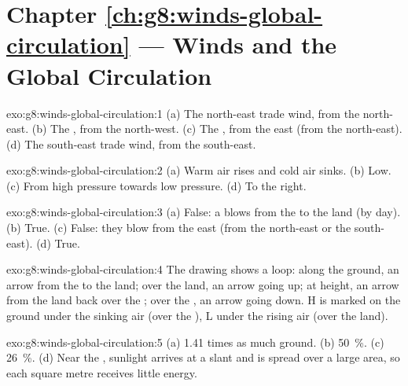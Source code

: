 \section*{Chapter \ref{ch:g8:winds-global-circulation} --- Winds and the Global Circulation}

\begin{solution}{exo:g8:winds-global-circulation:1}
(a) The north-east trade wind, from the north-east. (b) The ,
from the north-west. (c) The , from the east (from the
north-east). (d) The south-east trade wind, from the south-east.
\end{solution}

\begin{solution}{exo:g8:winds-global-circulation:2}
(a) Warm air rises and cold air sinks. (b) Low. (c) From high pressure
towards low pressure. (d) To the right.
\end{solution}

\begin{solution}{exo:g8:winds-global-circulation:3}
(a) False: a  blows from the  to the land (by day).
(b) True. (c) False: they blow from the east (from the north-east or the
south-east). (d) True.
\end{solution}

\begin{solution}{exo:g8:winds-global-circulation:4}
The drawing shows a loop: along the ground, an arrow from the  to the
land; over the land, an arrow going up; at height, an arrow from the land
back over the ; over the , an arrow going down. H is marked on the
ground under the sinking air (over the ), L under the rising air (over
the land).
\end{solution}

\begin{solution}{exo:g8:winds-global-circulation:5}
(a) 1.41 times as much ground. (b) 50~\%. (c) 26~\%. (d) Near the
, sunlight arrives at a slant and is spread over a large area, so
each square metre receives little energy.
\end{solution}

